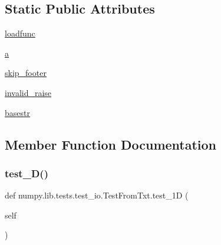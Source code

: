 \subsection*{Static Public Attributes}
\begin{DoxyCompactItemize}
\item 
\hyperlink{classnumpy_1_1lib_1_1tests_1_1test__io_1_1TestFromTxt_a4cf6e5f557f0e9b7d1dafc3b2f97ea81}{loadfunc}
\item 
\hyperlink{classnumpy_1_1lib_1_1tests_1_1test__io_1_1TestFromTxt_abbec608741c101f815855af525a8ce84}{a}
\item 
\hyperlink{classnumpy_1_1lib_1_1tests_1_1test__io_1_1TestFromTxt_ad66ab5a99aa408eb06b03bdff459763a}{skip\+\_\+footer}
\item 
\hyperlink{classnumpy_1_1lib_1_1tests_1_1test__io_1_1TestFromTxt_aed7f028384ee4b29dfea256b5d26858b}{invalid\+\_\+raise}
\item 
\hyperlink{classnumpy_1_1lib_1_1tests_1_1test__io_1_1TestFromTxt_ae1ad285fa7251d670897a0a71581487b}{basestr}
\end{DoxyCompactItemize}


\subsection{Member Function Documentation}
\mbox{\label{classnumpy_1_1lib_1_1tests_1_1test__io_1_1TestFromTxt_a9a766aaa3e282026829beb9aa897a0d2}} 
\subsubsection{\texorpdfstring{test\+\_\+D()}{test\_1D()}}
{\footnotesize\ttfamily def numpy.\+lib.\+tests.\+test\+\_\+io.\+Test\+From\+Txt.\+test\+\_\+1D (\begin{DoxyParamCaption}\item[{}]{self }\end{DoxyParamCaption})}

\mbox{\label{classnumpy_1_1lib_1_1tests_1_1test__io_1_1TestFromTxt_a10b94d23b66ca34ab6c396f27ef91d51}} 
